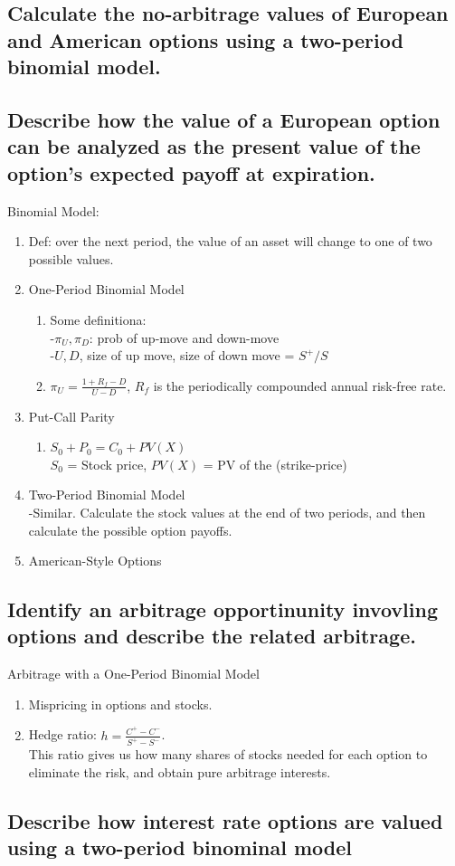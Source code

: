 \documentclass{article}
\newcommand{\be}{\begin{enumerate}}
\newcommand{\ee}{\end{enumerate}}
\begin{document}
\subsection{Calculate the no-arbitrage values of European and American options
using a two-period binomial model.}
\subsection{Describe how the value of a European option can be analyzed as the 
present value of the option's expected payoff at expiration.}
Binomial Model: 
\be
    \item Def: over the next period, the value of an asset will change to one of
    two possible values.
    \item One-Period Binomial Model
    \be
        \item Some definitiona:
            \\-$\pi_U,\pi_D$: prob of up-move and down-move
            \\-$U,D$, size of up move, size of down move = $S^+/S$
        \item $\pi_U = \frac{1+R_f-D}{U-D}$, $R_f$ is the periodically compounded
        annual risk-free rate.
    \ee
    \item Put-Call Parity
    \be
        \item $S_0 + P_0 = C_0 + PV(X)$
        \\$S_0$ = Stock price, $PV(X)$ = PV of the (strike-price)
    \ee
    \item Two-Period Binomial Model
    \\-Similar. Calculate the stock values at the end of two periods, and then calculate 
    the possible option payoffs.
    \item American-Style Options
\ee
\subsection{Identify an arbitrage opportinunity invovling options and describe the
related arbitrage.}
Arbitrage with a One-Period Binomial Model
\be
    \item Mispricing in options and stocks.
    \item Hedge ratio: $h=\frac{C^+-C^-}{S^+-S^-}$.
        \\This ratio gives us how many shares of stocks needed for each option
        to eliminate the risk, and obtain pure arbitrage interests.
\ee
\subsection{Describe how interest rate options are valued using a two-period binominal
model}
\end{document}
